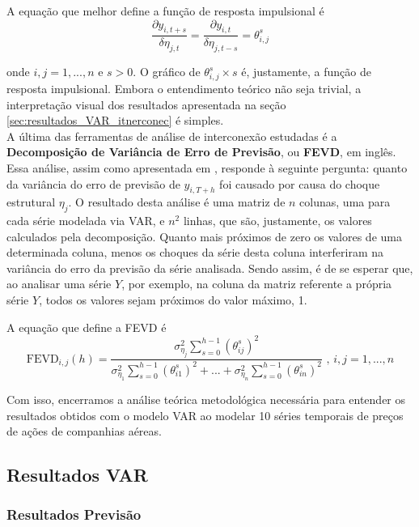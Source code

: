 \documentclass[12pt]{article}
\begin{document}
	A equação que melhor define a função de resposta impulsional é
	\begin{equation*}
		\dfrac{\partial y_{i,t+s}}{\delta \eta_{j,t}}=\dfrac{\partial y_{i,t}}{\delta \eta_{j,t-s}}=\theta^s_{i,j}
	\end{equation*}

	onde $i,j=1,...,n$ e $s>0$. O gráfico de $\theta^s_{i,j}\times s$ é, justamente, a função de resposta impulsional. Embora o entendimento teórico não seja trivial, a interpretação visual dos resultados apresentada na seção \ref{sec:resultados_VAR_itnerconec} é simples. \\
	
	A última das ferramentas de análise de interconexão estudadas é a \textbf{Decomposição de Variância de Erro de Previsão}, ou \textbf{FEVD}, em inglês. Essa análise, assim como apresentada em \cite{VAR}, responde à seguinte pergunta: quanto da variância do erro de previsão de $y_{i,T+h}$ foi causado por causa do choque estrutural $\eta_j$. O resultado desta análise é uma matriz de $n$ colunas, uma para cada série modelada via VAR, e $n^2$ linhas, que são, justamente, os valores calculados pela decomposição. Quanto mais próximos de zero os valores de uma determinada coluna, menos os choques da série desta coluna interferiram na variância do erro da previsão da série analisada. Sendo assim, é de se esperar que, ao analisar uma série $Y$, por exemplo, na coluna da matriz referente a própria série $Y$, todos os valores sejam próximos do valor máximo, 1.
	
	A equação que define a FEVD é
	\begin{equation*}
		\textrm{FEVD}_{i,j}(h)=\dfrac{\sigma^2_{\eta_j}\sum_{s=0}^{h-1}(\theta^s_{ij})^2}{\sigma^2_{\eta_1}\sum_{s=0}^{h-1}(\theta^s_{i1})^2+...+\sigma^2_{\eta_n}\sum_{s=0}^{h-1}(\theta^s_{in})^2}\mbox{   , }i,j=1,...,n
	\end{equation*}
	
	Com isso, encerramos a análise teórica metodológica necessária para entender os resultados obtidos com o modelo VAR ao modelar 10 séries temporais de preços de ações de companhias aéreas.
	
	\subsection{Resultados VAR}
	\subsubsection{Resultados Previsão}\label{sec:resultados_VAR_previsao}
	
\end{document}
